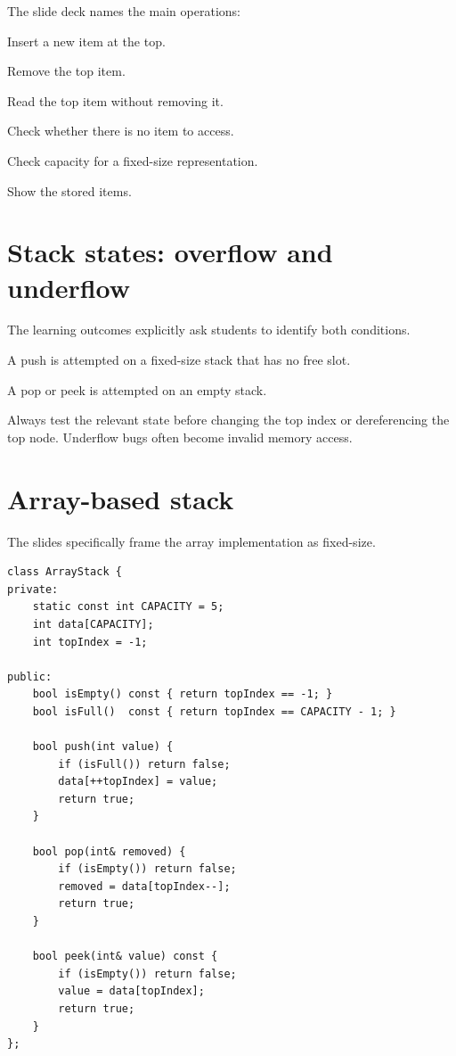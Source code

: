 The slide deck names the main operations:

\begin{description}[leftmargin=1.2in,style=nextline]
  \item[push()] Insert a new item at the top.
  \item[pop()] Remove the top item.
  \item[peek()] Read the top item without removing it.
  \item[isEmpty()] Check whether there is no item to access.
  \item[isFull()] Check capacity for a fixed-size representation.
  \item[display()] Show the stored items.
\end{description}

\section{Stack states: overflow and underflow}

The learning outcomes explicitly ask students to identify both conditions.

\begin{description}[leftmargin=1.35in,style=nextline]
  \item[Overflow] A push is attempted on a fixed-size stack that has no free slot.
  \item[Underflow] A pop or peek is attempted on an empty stack.
\end{description}

\begin{pitfall}
Always test the relevant state before changing the top index or dereferencing the top node. Underflow bugs often become invalid memory access.
\end{pitfall}

\section{Array-based stack}

The slides specifically frame the array implementation as fixed-size.

\begin{lstlisting}
class ArrayStack {
private:
    static const int CAPACITY = 5;
    int data[CAPACITY];
    int topIndex = -1;

public:
    bool isEmpty() const { return topIndex == -1; }
    bool isFull()  const { return topIndex == CAPACITY - 1; }

    bool push(int value) {
        if (isFull()) return false;
        data[++topIndex] = value;
        return true;
    }

    bool pop(int& removed) {
        if (isEmpty()) return false;
        removed = data[topIndex--];
        return true;
    }

    bool peek(int& value) const {
        if (isEmpty()) return false;
        value = data[topIndex];
        return true;
    }
};
\end{lstlisting}

